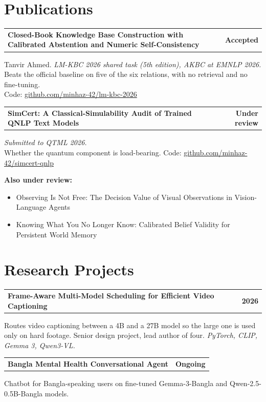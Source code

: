 \documentclass[10pt,letterpaper]{article}
\makeatletter
\newcommand{\entryhead}[2]{\par\needspace{4\baselineskip}\vspace{5pt}\noindent%
  \begin{tabular*}{\textwidth}[t]{@{}>{\raggedright\arraybackslash}p{0.75\textwidth}@{\extracolsep{\fill}}r@{}}
    \textbf{#1} & #2
  \end{tabular*}\par\vspace{1pt}}
\newcommand{\entry}[2]{\entryhead{#1}{\textbf{#2}}}
\newcommand{\gap}{\par\vspace{6pt}}
\let\origsection\section
\renewcommand{\section}[1]{\needspace{5\baselineskip}\origsection{#1}}
\makeatother
\begin{document}
\section{Publications}

\entry{Closed-Book Knowledge Base Construction with Calibrated Abstention and Numeric Self-Consistency}{Accepted}
Tanvir Ahmed. \textit{LM-KBC 2026 shared task (5th edition), AKBC at EMNLP 2026.}\\
Beats the official baseline on five of the six relations, with no retrieval and no fine-tuning.\\
Code: \href{https://github.com/minhaz-42/lm-kbc-2026}{github.com/minhaz-42/lm-kbc-2026}
\gap

\entry{SimCert: A Classical-Simulability Audit of Trained QNLP Text Models}{Under review}
\textit{Submitted to QTML 2026.}\\
Whether the quantum component is load-bearing.
Code: \href{https://github.com/minhaz-42/simcert-qnlp}{github.com/minhaz-42/simcert-qnlp}
\gap

\noindent\textbf{Also under review:}
\begin{itemize}
  \item Observing Is Not Free: The Decision Value of Visual Observations in Vision-Language Agents
  \item Knowing What You No Longer Know: Calibrated Belief Validity for Persistent World Memory
\end{itemize}

\section{Research Projects}

\entry{Frame-Aware Multi-Model Scheduling for Efficient Video Captioning}{2026}
Routes video captioning between a 4B and a 27B model so the large one is used only on hard footage.
Senior design project, lead author of four. \textit{PyTorch, CLIP, Gemma 3, Qwen3-VL.}
\gap

\entry{Bangla Mental Health Conversational Agent}{Ongoing}
Chatbot for Bangla-speaking users on fine-tuned Gemma-3-Bangla and Qwen-2.5-0.5B-Bangla models.

\end{document}
